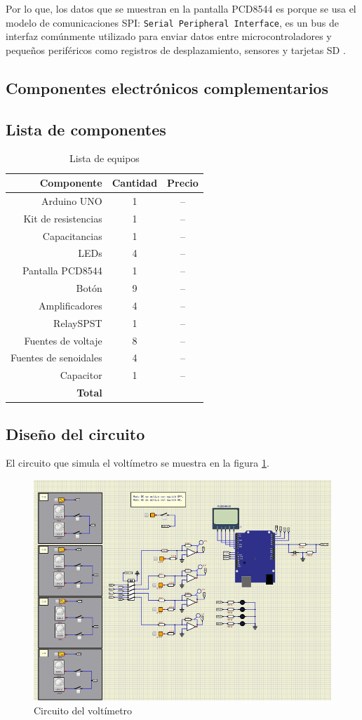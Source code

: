 Por lo que, los datos que se muestran en la pantalla PCD8544 es porque se usa el modelo de comunicaciones SPI: \texttt{Serial Peripheral Interface}, es un bus de interfaz comúnmente utilizado para enviar datos entre microcontroladores y pequeños periféricos como registros de desplazamiento, sensores y tarjetas SD \cite{web3}.
\subsection*{Componentes electrónicos complementarios}

\subsection*{Lista de componentes}

\begin{table}[H]
\caption{Lista de equipos}
\label{table_2}
\begin{center}
\begin{tabular}{r|cc}
\hline
\textbf{Componente}&\textbf{Cantidad}&\textbf{Precio}\\
 \hline
Arduino UNO&1   &-- \\ \hline 
Kit de resistencias &1   &-- \\ \hline 
Capacitancias&1   &-- \\ \hline 
LEDs&4   &-- \\ \hline 
Pantalla PCD8544&1   &-- \\ \hline 
Botón&9   &-- \\ \hline 
Amplificadores&4   &-- \\ \hline 
RelaySPST & 1 & --\\ \hline 
Fuentes de voltaje& 8&--\\ \hline 
Fuentes de senoidales& 4&--\\ \hline 
Capacitor& 1&--\\ \hline 
 \textbf{Total}& &  \\
 \hline
\end{tabular}
\end{center}
\end{table}

\subsection*{Diseño del circuito}
El circuito que simula el voltímetro se muestra en la figura \ref{fig3}.
\begin{figure}[H]
\centering
\includegraphics[width=.8\linewidth]{Imagenes/3.png}
 \caption{Circuito del voltímetro}
 \label{fig3}
\end{figure}

\newpage